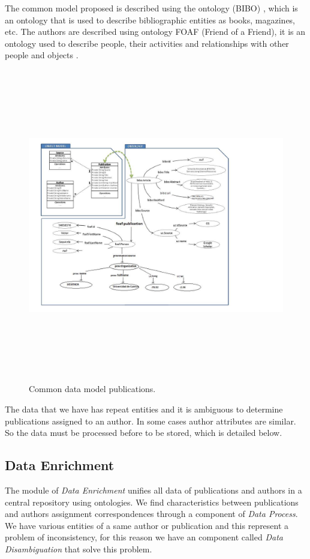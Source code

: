 \documentclass[11pt]{article}
\begin{document}
The common model proposed is described using the ontology (BIBO) \cite{Frederick}, which is an ontology that is used to describe bibliographic entities as books, magazines, etc. The authors are described using ontology FOAF (Friend of a Friend), it is an ontology used to describe people, their activities and  relationships with other people and objects \cite{brickley2012foaf}. %

 \begin{figure}[ht!]
	\centering
		\includegraphics[height=13.7cm]{dataModelCommon.png}
	\caption{Common data model publications.}
	\label{fig:CommonDataModel}
\end{figure}

The data that we have has repeat entities and it is  ambiguous  to determine  publications assigned to an author. In some cases author attributes are similar. So the data must be processed before to be stored, which is detailed below.

\subsection{Data Enrichment}

The module of \emph{Data Enrichment} unifies all data of publications and authors in a central repository using ontologies. We find characteristics between publications and authors assignment correspondences through a component of \emph{Data Process}. We have various entities of a same author or publication and this represent a problem of inconsistency, for this reason we have an component called \emph{Data Disambiguation} that solve this problem.%
\end{document}
